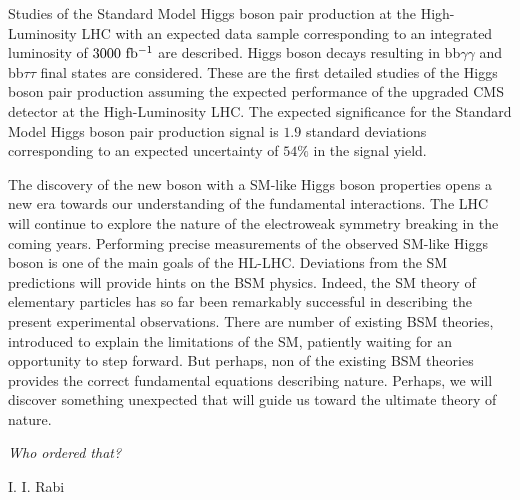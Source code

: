 Studies of the Standard Model Higgs boson pair production at the High-Luminosity LHC with an expected data sample corresponding to an integrated luminosity of $3000~\mathrm{fb^{-1}}$ are described. Higgs boson decays resulting in bb$\gamma\gamma$ and bb$\tau\tau$ final states are considered. These are the first detailed studies of the Higgs boson pair production assuming the expected performance of the upgraded CMS detector at the High-Luminosity LHC. The expected significance for the Standard Model Higgs boson pair production signal is $1.9$ standard deviations corresponding to an expected uncertainty of $54\%$ in the signal yield. 

The discovery of the new boson with a SM-like Higgs boson properties opens a new era towards our understanding of the fundamental interactions. The LHC will continue to explore the nature of the electroweak symmetry breaking in the coming years. Performing precise measurements of the observed SM-like Higgs boson is one of the main goals of the HL-LHC. Deviations from the SM predictions will provide hints on the BSM physics. Indeed, the SM theory of elementary particles has so far been remarkably successful in describing the present experimental observations. There are number of existing BSM theories, introduced to explain the limitations of the SM, patiently waiting for an opportunity to step forward. But perhaps, non of the existing BSM theories provides the correct fundamental equations describing nature. Perhaps, we will discover something unexpected that will guide us toward the ultimate theory of nature.

\epigraph{\textit{Who ordered that?}}{I. I. Rabi}


